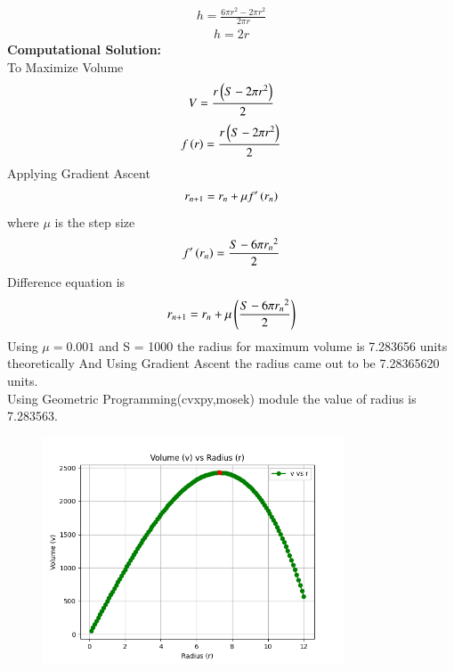 \documentclass[journal]{IEEEtran}
\numberwithin{equation}{enumi}
\numberwithin{figure}{enumi}
\begin{document}
\begin{align}
	h = \frac{6\pi r^2 - 2\pi r^2}{2\pi r}
\end{align}
\begin{align}
	h = 2r
\end{align}
\textbf{Computational Solution:} \\
To Maximize Volume 
\begin{align}
	V = \frac{r\left(S - 2\pi r^2\right)}{2} 
\end{align}
\begin{align}
	f\left(r\right) = \frac{r\left(S - 2\pi r^2\right)}{2}
\end{align}
Applying Gradient Ascent
\begin{align}
	r_{n+1} = r_n + \mu f^\prime\left(r_n\right)
\end{align}
where $\mu$ is the step size
\begin{align}
	f^\prime\left(r_n\right) = \frac{S - 6\pi {r_n}^2}{2}
\end{align}
Difference equation is
\begin{align}
	r_{n+1} = r_n + \mu \left(\frac{S - 6\pi {r_n}^2}{2}\right)
\end{align}
Using $\mu = 0.001$ and S = 1000 the radius for maximum volume is 7.283656 units theoretically And Using Gradient Ascent the radius came out to be 7.28365620 units. \\
Using Geometric Programming(cvxpy,mosek) module the value of radius is 7.283563.

\begin{figure}[H]
    \centering
    \includegraphics[width=0.8\textwidth]{figs/fig.png}
\end{figure}
\end{document}
